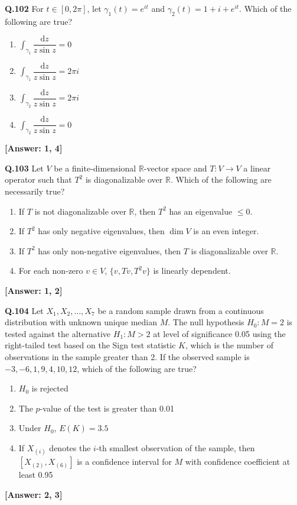 \documentclass[12pt,a4paper]{article}
\newcommand{\ans}[1]{\quad\textcolor{anscolor}{\textbf{[Answer: #1]}}}
\begin{document}
\textbf{Q.102} For $t\in[0,2\pi]$, let $\gamma_1(t)=e^{it}$ and $\gamma_2(t)=1+i+e^{it}$. Which of the following are true?
\begin{enumerate}[label=\arabic*.]
\item $\displaystyle\int_{\gamma_1}\dfrac{\mathrm{d}z}{z\sin z}=0$
\item $\displaystyle\int_{\gamma_1}\dfrac{\mathrm{d}z}{z\sin z}=2\pi i$
\item $\displaystyle\int_{\gamma_2}\dfrac{\mathrm{d}z}{z\sin z}=2\pi i$
\item $\displaystyle\int_{\gamma_2}\dfrac{\mathrm{d}z}{z\sin z}=0$
\end{enumerate}\ans{1, 4}

\textbf{Q.103} Let $V$ be a finite-dimensional $\mathbb{R}$-vector space and $T:V\to V$ a linear operator such that $T^2$ is diagonalizable over $\mathbb{R}$. Which of the following are necessarily true?
\begin{enumerate}[label=\arabic*.]
\item If $T$ is not diagonalizable over $\mathbb{R}$, then $T^2$ has an eigenvalue $\le0$.
\item If $T^2$ has only negative eigenvalues, then $\dim V$ is an even integer.
\item If $T^2$ has only non-negative eigenvalues, then $T$ is diagonalizable over $\mathbb{R}$.
\item For each non-zero $v\in V$, $\{v,Tv,T^2v\}$ is linearly dependent.
\end{enumerate}\ans{1, 2}

\textbf{Q.104} Let $X_1,X_2,\ldots,X_7$ be a random sample drawn from a continuous distribution with unknown unique median $M$. The null hypothesis $H_0:M=2$ is tested against the alternative $H_1:M>2$ at level of significance 0.05 using the right-tailed test based on the Sign test statistic $K$, which is the number of observations in the sample greater than 2. If the observed sample is $-3,-6,1,9,4,10,12$, which of the following are true?
\begin{enumerate}[label=\arabic*.]
\item $H_0$ is rejected
\item The $p$-value of the test is greater than 0.01
\item Under $H_0$, $E(K)=3.5$
\item If $X_{(i)}$ denotes the $i$-th smallest observation of the sample, then $[X_{(2)},X_{(6)}]$ is a confidence interval for $M$ with confidence coefficient at least 0.95
\end{enumerate}\ans{2, 3}
\end{document}

